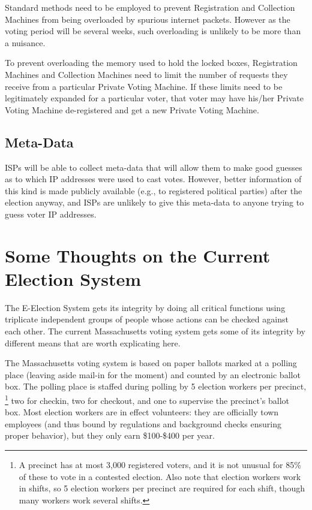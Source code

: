 \documentclass[12pt]{article}
\begin{document}
Standard methods need to be employed to prevent Registration and
Collection Machines from being overloaded by spurious internet packets.
However as the voting period will be several weeks, such
overloading is unlikely to be more than a nuisance.

To prevent overloading the memory used to hold the locked boxes,
Registration Machines and Collection Machines need to limit the
number of requests they receive from a particular Private Voting Machine.
If these limits need to be legitimately expanded for a particular
voter, that voter may have his/her Private Voting Machine de-registered
and get a new Private Voting Machine.

\subsection{Meta-Data}

ISPs will be able to collect meta-data that will allow them to
make good guesses as to which IP addresses were used to cast votes.
However, better information of this kind is made publicly available
(e.g., to registered political parties) after the election anyway,
and ISPs are unlikely to give this meta-data to anyone trying to
guess voter IP addresses.


\section{Some Thoughts on the Current Election System}

The E-Election System gets its integrity by doing all critical
functions using triplicate independent groups of people
whose actions can be checked against each other.  The current
Massachusetts voting system gets some of its integrity by different
means that are worth explicating here.

The Massachusetts voting system is based on paper
ballots marked at a polling place (leaving aside mail-in for the moment)
and counted by an electronic ballot box.  The polling place
is staffed during polling by 5 election workers per precinct,
\footnote{A precinct has at most 3,000 registered voters, and it is
not unusual for 85\% of these to vote in a contested election.  Also
note that election workers work in shifts, so 5 election workers
per precinct are required for each shift, though many workers
work several shifts.}
two for checkin, two for checkout, and one to supervise the precinct's
ballot box.  Most
election workers are in effect volunteers: they are officially
town employees (and thus bound by regulations and background checks
ensuring proper behavior), but they only earn \$100-\$400 per year.
\end{document}
